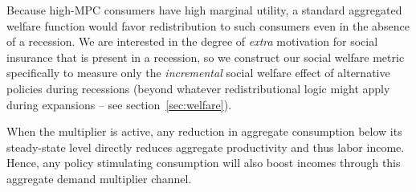 \documentclass[\econtexRoot/HAFiscal]{subfiles}
\begin{document}
Because high-MPC consumers have high marginal utility, a standard aggregated welfare function would favor redistribution to such consumers even in the absence of a recession. We are interested in the degree of \textit{extra} motivation for social insurance that is present in a recession, so we construct our social welfare metric specifically to measure only the \textit{incremental} social welfare effect of alternative policies during recessions (beyond whatever redistributional logic might apply during expansions -- see section~\ref{sec:welfare}).

When the multiplier is active, any reduction in aggregate consumption below its steady-state level directly reduces aggregate productivity and thus labor income. Hence, any policy stimulating consumption will also boost incomes through this aggregate demand multiplier channel.

\end{document}
